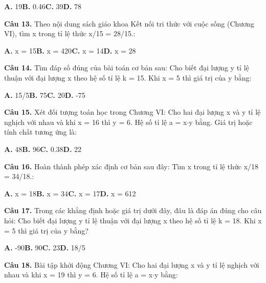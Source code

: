 \documentclass[11pt,a4paper]{article}
\begin{document}
\hspace*{1.5em}\textbf{A.} 19\quad\quad \textbf{B.} 0.46\quad\quad \textbf{C.} 39\quad\quad \textbf{D.} 78\par\vspace{2pt}
\textbf{\color{primary} Câu 13.} Theo nội dung sách giáo khoa Kết nối tri thức với cuộc sống (Chương VI), tìm x trong tỉ lệ thức x/15 = 28/15.:\par
\hspace*{1.5em}\textbf{A.} x = 15\quad\quad \textbf{B.} x = 420\quad\quad \textbf{C.} x = 14\quad\quad \textbf{D.} x = 28\par\vspace{2pt}
\textbf{\color{primary} Câu 14.} Tìm đáp số đúng của bài toán cơ bản sau: Cho biết đại lượng y tỉ lệ thuận với đại lượng x theo hệ số tỉ lệ k = 15. Khi x = 5 thì giá trị của y bằng:\par
\hspace*{1.5em}\textbf{A.} 15/5\quad\quad \textbf{B.} 75\quad\quad \textbf{C.} 20\quad\quad \textbf{D.} -75\par\vspace{2pt}
\textbf{\color{primary} Câu 15.} Xét đối tượng toán học trong Chương VI: Cho hai đại lượng x và y tỉ lệ nghịch với nhau và khi x = 16 thì y = 6. Hệ số tỉ lệ a = x$\cdot$y bằng. Giá trị hoặc tính chất tương ứng là:\par
\hspace*{1.5em}\textbf{A.} 48\quad\quad \textbf{B.} 96\quad\quad \textbf{C.} 0.38\quad\quad \textbf{D.} 22\par\vspace{2pt}
\textbf{\color{primary} Câu 16.} Hoàn thành phép xác định cơ bản sau đây: Tìm x trong tỉ lệ thức x/18 = 34/18.:\par
\hspace*{1.5em}\textbf{A.} x = 18\quad\quad \textbf{B.} x = 34\quad\quad \textbf{C.} x = 17\quad\quad \textbf{D.} x = 612\par\vspace{2pt}
\textbf{\color{primary} Câu 17.} Trong các khẳng định hoặc giá trị dưới đây, đâu là đáp án đúng cho câu hỏi: Cho biết đại lượng y tỉ lệ thuận với đại lượng x theo hệ số tỉ lệ k = 18. Khi x = 5 thì giá trị của y bằng?\par
\hspace*{1.5em}\textbf{A.} -90\quad\quad \textbf{B.} 90\quad\quad \textbf{C.} 23\quad\quad \textbf{D.} 18/5\par\vspace{2pt}
\textbf{\color{primary} Câu 18.} Bài tập khởi động Chương VI: Cho hai đại lượng x và y tỉ lệ nghịch với nhau và khi x = 19 thì y = 6. Hệ số tỉ lệ a = x$\cdot$y bằng:\par
\end{document}
